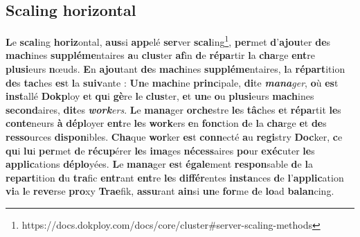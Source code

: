 \documentclass{rapportClass} %
\begin{document}
\subsection{Scaling horizontal}
\textbf{L}e \textbf{scal}ing \textbf{horiz}ontal, \textbf{aus}si \textbf{app}elé \textbf{ser}ver \textbf{scal}ing\footnote{https://docs.dokploy.com/docs/core/cluster#server-scaling-methods},
\textbf{per}met \textbf{d}'\textbf{ajou}ter \textbf{de}s \textbf{mach}ines \textbf{suppléme}ntaires \textbf{a}u \textbf{clus}ter \textbf{af}in \textbf{d}e \textbf{répa}rtir \textbf{l}a \textbf{cha}rge \textbf{ent}re \textbf{plusi}eurs \textbf{n}œuds.
\textbf{E}n \textbf{ajou}tant \textbf{de}s \textbf{mach}ines \textbf{suppléme}ntaires, \textbf{l}a \textbf{répart}ition \textbf{de}s \textbf{tac}hes \textbf{es}t \textbf{l}a \textbf{suiv}ante :
\textbf{Un}e \textbf{mach}ine \textbf{princ}ipale, \textbf{di}te \textit{\textbf{mana}ger}, \textbf{o}ù \textbf{es}t \textbf{inst}allé \textbf{Dokp}loy \textbf{e}t \textbf{qu}i \textbf{gè}re \textbf{l}e \textbf{clus}ter, \textbf{e}t \textbf{un}e \textbf{o}u \textbf{plusi}eurs 
\textbf{mach}ines \textbf{second}aires, \textbf{dit}es \textit{\textbf{work}ers}. \textbf{L}e \textbf{mana}ger \textbf{orche}stre \textbf{le}s \textbf{tâc}hes \textbf{e}t \textbf{répa}rtit \textbf{le}s \textbf{conte}neurs \textbf{à} \textbf{dépl}oyer 
\textbf{ent}re \textbf{le}s \textbf{work}ers \textbf{e}n \textbf{fonc}tion \textbf{d}e \textbf{l}a \textbf{cha}rge \textbf{e}t \textbf{de}s \textbf{resso}urces \textbf{dispon}ibles.
\textbf{Cha}que \textbf{wor}ker \textbf{es}t \textbf{conn}ecté \textbf{a}u \textbf{regi}stry \textbf{Doc}ker, \textbf{c}e \textbf{qu}i \textbf{lu}i \textbf{per}met \textbf{d}e \textbf{récup}érer \textbf{le}s \textbf{ima}ges \textbf{nécess}aires \textbf{po}ur \textbf{exéc}uter \textbf{le}s \textbf{applic}ations \textbf{déplo}yées.
\textbf{L}e \textbf{mana}ger \textbf{es}t \textbf{égale}ment \textbf{respon}sable \textbf{d}e \textbf{l}a \textbf{repart}ition \textbf{d}u \textbf{tra}fic \textbf{entr}ant \textbf{ent}re \textbf{le}s \textbf{différ}entes \textbf{insta}nces \textbf{d}e \textbf{l}'\textbf{applic}ation 
\textbf{vi}a \textbf{l}e \textbf{reve}rse \textbf{pro}xy \textbf{Trae}fik, \textbf{assu}rant \textbf{ain}si \textbf{un}e \textbf{for}me \textbf{d}e \textbf{lo}ad \textbf{balan}cing.



\end{document}
